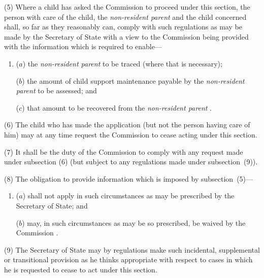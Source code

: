 \documentclass[12pt,a4paper]{article}
\begin{document}
(5) Where a child has asked the 
Commission  %
to proceed under this section, the person with care of the child, the 
\emph{non-resident parent}  %
and the child concerned shall, so far as they reasonably can, comply with such regulations as may be made by the Secretary of State with a view to the 
Commission  %
being provided with the information which is required to enable—
\begin{enumerate}\item[]
($a$) the 
\emph{non-resident parent}  %
to be traced (where that is necessary);

($b$) the amount of child support maintenance payable by the 
\emph{non-resident parent}  %
to be assessed; and

($c$) that amount to be recovered from the 
\emph{non-resident parent}%
.
\end{enumerate}

(6) The child who has made the application (but not the person having care of him) may at any time request the 
Commission  %
to cease acting under this section.

(7) It shall be the duty of the 
Commission  %
to comply with any request made under subsection (6)  (but subject to any regulations made under subsection~(9)).

(8) The obligation to provide information which is imposed by subsection~(5)—
\begin{enumerate}\item[]
($a$) shall not apply in such circumstances as may be prescribed by the Secretary of State; and

($b$) may, in such circumstances as may be so prescribed, be waived by the 
Commission%
.
\end{enumerate}

(9) The Secretary of State may by regulations make such incidental, supplemental or transitional provision as he thinks appropriate with respect to cases in which he is requested to cease to act under this section.
\end{document}
